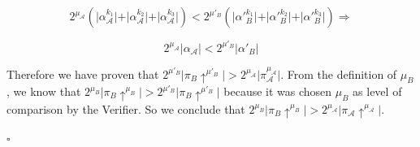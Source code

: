 \begin{equation*}
2^{\mu_\mathcal{A}} ( \vert \alpha_\mathcal{A}^{k_1} \vert + \vert \alpha_\mathcal{A}^{k_2} \vert + \vert
\alpha_\mathcal{A}^{k_3} \vert ) < 2^{\mu'_B} ( \vert \alpha'{_B^{k_1}} \vert + \vert
\alpha'{_B^{k_2}} \vert + \vert \alpha'{_B^{k_3}} \vert) \Rightarrow
\end{equation*}

\begin{equation} \label{eq_v_all_round_sets}
2^{\mu_\mathcal{A}} \vert \alpha_\mathcal{A} \vert < 2^{\mu'_B} \vert \alpha'{_B} \vert
\end{equation}

Therefore we have proven that $2^{\mu'_B} \vert \pi_B \uparrow^{\mu'_B} \vert >
2^{\mu_\mathcal{A}} \vert \pi_\mathcal{A}^{\mu_\mathcal{A}} \vert$. From the definition of $\mu_B$, we know
that $2^{\mu_B} \vert \pi_B \uparrow^{\mu_B} \vert > 2^{\mu'_B} \vert \pi_B
\uparrow^{\mu'_B} \vert$ because it was chosen $\mu_B$ as level of comparison
by the Verifier. So we conclude that $2^{\mu_B} \vert \pi_B \uparrow^{\mu_B}
\vert > 2^{\mu_\mathcal{A}} \vert \pi_\mathcal{A} \uparrow^{\mu_\mathcal{A}} \vert$.

\begin{flushright}
$\square$
\end{flushright}